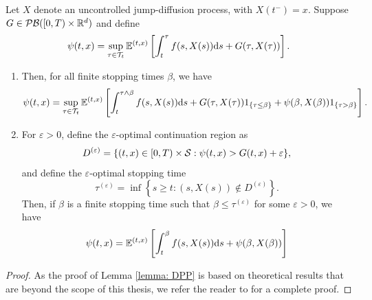 \begin{lemma}
\label{lemma: DPP}
    Let $X$ denote an uncontrolled jump-diffusion process, with $X(t^-)=x$. Suppose $G \in \mathcal{PB}([0,T)\times \mathbb{R}^d)$ and define 
    \begin{equation}
        \psi(t,x) = \sup_{\tau \in \mathcal{T}_t}\mathbb{E}^{(t,x)}\left[ \int_t^\tau f(s,X(s)) \mathrm{d} s + G(\tau, X(\tau)) \right].
        \label{eqn: (10.1.15) in ØS}
    \end{equation}
    \begin{enumerate}[label=(\alph*)]
        \item Then, for all finite stopping times $\beta$, we have
        \begin{equation}
            \psi(t,x) = \sup_{\tau \in \mathcal{T}_t} \mathbb{E}^{(t,x)}\left[ \int_t^{\tau \wedge\beta} f(s,X(s)) \mathrm{d} s + G(\tau, X(\tau))1_{\left\{\tau \leq \beta\right\}} + \psi(\beta,X(\beta))1_{\left\{\tau > \beta\right\}} \right].
            \label{eqn: (10.1.16) in ØS}
        \end{equation}
        \item For $\varepsilon>0$, define the $\varepsilon$-optimal continuation region as
        \begin{equation*}
            D^{(\varepsilon)} = \{(t,x) \in [0,T)\times \mathcal{S}: \psi(t,x) > G(t,x) + \varepsilon\},
        \end{equation*}
        and define the $\varepsilon$-optimal stopping time 
        \begin{equation*}
            \tau^{(\varepsilon)} = \inf\left\{s \geq t: (s,X(s)) \notin D^{(\varepsilon)}\right\}.
        \end{equation*}
        Then, if $\beta$ is a finite stopping time such that $\beta \leq \tau^{(\varepsilon)}$ for some $\varepsilon > 0$, we have
        \begin{equation}
            \psi(t,x) = \mathbb{E}^{(t,x)} \left[ \int_t^{\beta} f(s,X(s)) \mathrm{d} s + \psi(\beta, X(\beta)) \right]
        \end{equation}
    \end{enumerate}
\end{lemma}
\begin{proof}
    As the proof of Lemma \ref{lemma: DPP} is based on theoretical results that are beyond the scope of this thesis, we refer the reader to \cite[Section 4]{ishikawa2004optimal} for a complete proof.
\end{proof}

